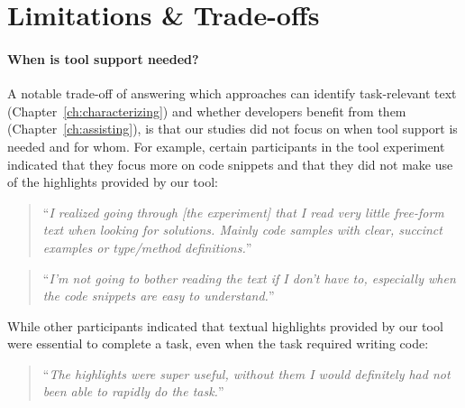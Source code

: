 



\section{Limitations \& Trade-offs}
\label{cp7:tools}






\paragraph{\textbf{When is tool support needed?}} 


A notable trade-off of answering which approaches can identify task-relevant text (Chapter~\ref{ch:characterizing}) and whether developers benefit from them (Chapter~\ref{ch:assisting}), is that our studies did not focus on when tool support is needed and for whom.
For example, certain participants in the \acs{tool} experiment indicated that they focus more on code snippets
and that they did not make use of the highlights provided by our tool:




\smallskip
\begin{footnotesize}
\begin{quote}
``\textit{I realized going through [the experiment] that I read very little free-form text when looking for solutions. Mainly code samples with clear, succinct examples or type/method definitions.}''
\end{quote}
\end{footnotesize}

\begin{footnotesize}
\begin{quote}
``\textit{I'm not going to bother reading the text if I don't have to, especially when the code snippets are easy to understand.}''
\end{quote}
\end{footnotesize}


While other participants indicated that textual highlights provided by our tool were essential to complete a task, even when the task required writing code:



\smallskip
\begin{footnotesize}
    \begin{quote}
        ``\textit{The highlights were super useful, without them I would definitely had not been able to rapidly do the task.}''
    \end{quote}
\end{footnotesize}


